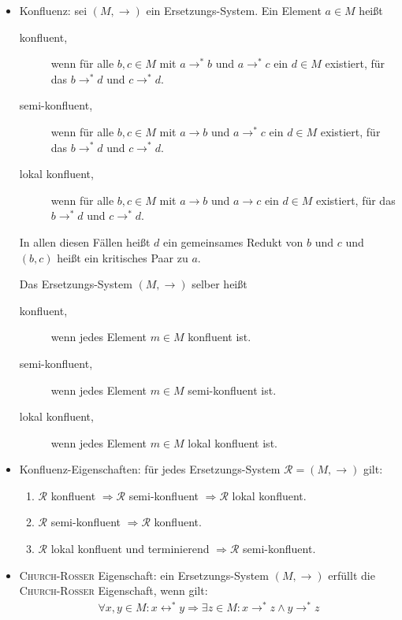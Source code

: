 \documentclass[
  a4paper,
  11pt,
]{scrartcl}
\newcommand{\Rc}{\mathcal{R}}
\begin{document}
\begin{itemize}
  \item Konfluenz: sei $(M, \rightarrow)$ ein Ersetzungs-System. Ein Element $a
    \in M$ heißt
    \begin{description}
      \item[konfluent,] wenn für alle $b, c \in M$ mit $a \rightarrow^* b$ und
        $a \rightarrow^* c$ ein $d \in M$ existiert, für das $b \rightarrow^* d$
        und $c \rightarrow^* d$.
      \item[semi-konfluent,] wenn für alle $b, c \in M$ mit $a \rightarrow b$
        und $a \rightarrow^* c$ ein $d \in M$ existiert, für das $b
        \rightarrow^* d$ und $c \rightarrow^* d$.
      \item[lokal konfluent,] wenn für alle $b, c \in M$ mit $a \rightarrow b$
        und $a \rightarrow c$ ein $d \in M$ existiert, für das $b \rightarrow^*
        d$ und $c \rightarrow^* d$.
    \end{description}
    In allen diesen Fällen heißt $d$ ein gemeinsames Redukt von $b$ und $c$ und
    $(b,c)$ heißt ein kritisches Paar zu $a$.

    Das Ersetzungs-System $(M, \rightarrow)$ selber heißt
    \begin{description}
      \item[konfluent,] wenn jedes Element $m \in M$ konfluent ist.
      \item[semi-konfluent,] wenn jedes Element $m \in M$ semi-konfluent ist.
      \item[lokal konfluent,] wenn jedes Element $m \in M$ lokal konfluent ist.
    \end{description}

  \item Konfluenz-Eigenschaften: für jedes Ersetzungs-System $\Rc = (M,
    \rightarrow)$ gilt:
    \begin{enumerate}
      \item $\Rc$ konfluent $\Rightarrow \Rc$ semi-konfluent
        $\Rightarrow \Rc$ lokal konfluent.
      \item $\Rc$ semi-konfluent $\Rightarrow \Rc$
        konfluent.
      \item $\Rc$ lokal konfluent und terminierend $\Rightarrow
        \Rc$ semi-konfluent.
    \end{enumerate}

  \item \textsc{Church-Rosser} Eigenschaft: ein Ersetzungs-System $(M,
    \rightarrow)$ erfüllt die \textsc{Church-Rosser} Eigenschaft, wenn gilt:
    \begin{align*}
      \forall x, y \in M:
      x \leftrightarrow^* y \Rightarrow
      \exists z \in M:
      x \rightarrow^* z \wedge y \rightarrow^* z
    \end{align*}


\end{itemize}
\end{document}
